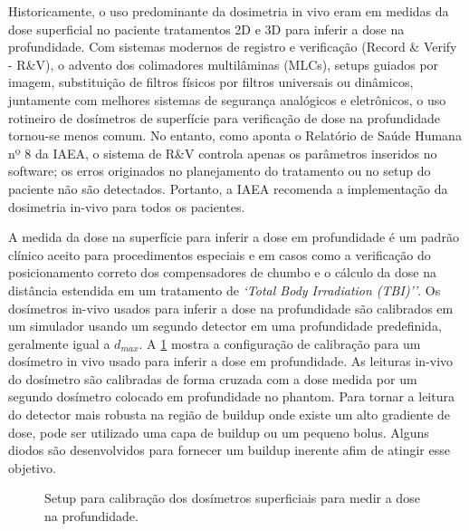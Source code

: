 \documentclass[11pt,a4paper]{article}
\begin{document}
	Historicamente, o uso predominante da dosimetria in vivo eram em medidas da dose superficial no paciente tratamentos 2D e 3D para inferir a dose na profundidade. Com sistemas modernos de registro e verificação (Record \& Verify - R\&V), o advento dos colimadores multilâminas (MLCs), setups guiados por imagem, substituição de filtros físicos por filtros universais ou dinâmicos, juntamente com melhores sistemas de segurança analógicos e eletrônicos, o uso rotineiro de dosímetros de superfície para verificação de dose na profundidade tornou-se menos comum. No entanto, como aponta o Relatório de Saúde Humana nº 8 da IAEA, o sistema de R\&V controla apenas os parâmetros inseridos no software; os erros originados no planejamento do tratamento ou no setup do paciente não são detectados. Portanto, a IAEA recomenda a implementação da dosimetria in-vivo para todos os pacientes.

	A medida da dose na superfície para inferir a dose em profundidade é um padrão clínico aceito para procedimentos especiais e em casos como a verificação do posicionamento correto dos compensadores de chumbo e o cálculo da dose na distância estendida em um tratamento de \textit{`Total Body Irradiation (TBI)''}. Os dosímetros in-vivo usados para inferir a dose na profundidade são calibrados em um simulador usando um segundo detector em uma profundidade predefinida, geralmente igual a $d_{max}$. A \ref{fig:setupCalibracaoDosimInVivo} mostra a configuração de calibração para um dosímetro in vivo usado para inferir a dose em profundidade. As leituras in-vivo do dosímetro são calibradas de forma cruzada com a dose medida por um segundo dosímetro colocado em profundidade no phantom. Para tornar a leitura do detector mais robusta na região de buildup onde existe um alto gradiente de dose, pode ser utilizado uma capa de buildup ou um pequeno bolus. Alguns diodos são desenvolvidos para fornecer um buildup inerente afim de atingir esse objetivo.

	\begin{figure}[h]
		\centering
		\caption{Setup para calibração dos dosímetros superficiais para medir a dose na profundidade.}
		\label{fig:setupCalibracaoDosimInVivo}
	\end{figure}
\end{document}
